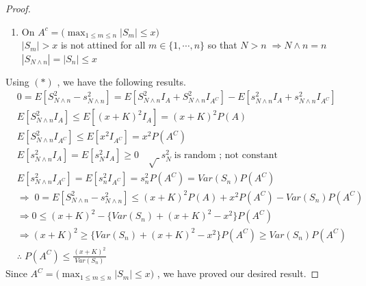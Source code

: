 \documentclass[12pt, A4]{article}
\begin{document}
\begin{proof}
\begin{enumerate}
        \item On $A^c=\big(\max_{1\leq m \leq n}|S_m|\leq x\big)$ \\ $|S_m|>x$ is not attined for all $m\in \{1, \cdots, n\}$ so that $N>n\; \Rightarrow N\wedge n =n$ \\ $|S_{N\wedge n}|=|S_n|\leq x$
    \end{enumerate}
    Using $(*)$ , we have the following results.
    \begin{align*}
        &0 = E[S_{N\wedge n}^2-s_{N\wedge n}^2]=E[S_{N\wedge n}^2 I_A+S_{N\wedge n}^2 I_{A^C}]-E[s_{N\wedge n}^2 I_A +s_{N\wedge n}^2 I_{A^C}] \\
        &E[S_{N\wedge n}^2 I_A]\leq E[(x+K)^2 I_A]=(x+K)^2 P(A) \\
        &E[S_{N\wedge n}^2 I_{A^C}]\leq E[x^2 I_{A^C}]=x^2P(A^C) \\
        &E[s_{N\wedge n}^2 I_A]=E[s_N^2 I_A]\geq 0 \quad \surd\; s_N^2 \; \text{is random ; not constant}\\
        &E[s_{N\wedge n}^2 I_{A^C}]=E[s_n^2 I_{A^C}]=s_n^2 P(A^C)=Var(S_n)P(A^C) \\
        &\Rightarrow \; 0 = E[S_{N\wedge n}^2-s_{N\wedge n}^2] \leq (x+K)^2P(A)+x^2P(A^C)-Var(S_n)P(A^C) \\
        &\Rightarrow 0\leq (x+K)^2 - \{Var(S_n)+(x+K)^2-x^2\}P(A^C) \\
        &\Rightarrow (x+K)^2\geq \{Var(S_n)+(x+K)^2-x^2\}P(A^C)\geq Var(S_n)P(A^C)\\
        &\therefore\; P(A^C) \leq \frac{(x+K)^2}{Var(S_n)}
    \end{align*}
    Since $A^C=\big(\max_{1\leq m \leq n}|S_m|\leq x\big)$ , we have proved our desired result.
\end{proof}
\end{document}
